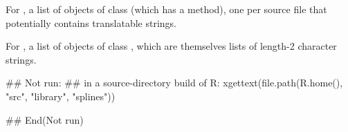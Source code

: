 %
\begin{Value}
For , a list of objects of class 
(which has a  method), one per source file that
potentially contains translatable strings.

For , a list of objects of class ,
which are themselves lists of length-2 character strings.
\end{Value}
%
\begin{Examples}
\begin{ExampleCode}
## Not run: ## in a source-directory build of R:
xgettext(file.path(R.home(), "src", "library", "splines"))

## End(Not run)
\end{ExampleCode}
\end{Examples}
\clearpage
